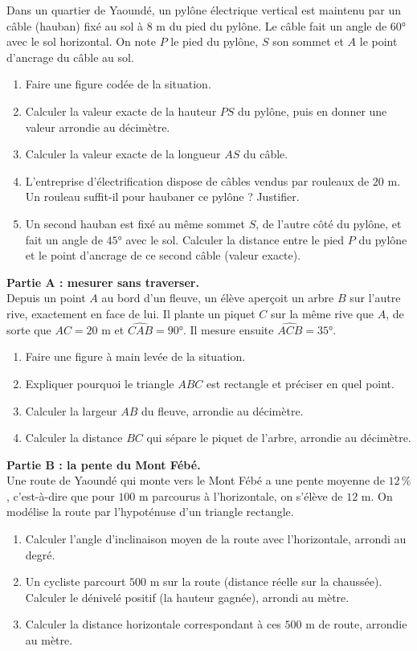 \documentclass[11pt]{article}
\begin{document}
\begin{exercice}
Dans un quartier de Yaoundé, un pylône électrique vertical est maintenu par un câble (hauban) fixé au sol à $8$ m du pied du pylône. Le câble fait un angle de $60°$ avec le sol horizontal. On note $P$ le pied du pylône, $S$ son sommet et $A$ le point d'ancrage du câble au sol.
\begin{enumerate}
\item Faire une figure codée de la situation.
\item Calculer la valeur exacte de la hauteur $PS$ du pylône, puis en donner une valeur arrondie au décimètre.
\item Calculer la valeur exacte de la longueur $AS$ du câble.
\item L'entreprise d'électrification dispose de câbles vendus par rouleaux de $20$ m. Un rouleau suffit-il pour haubaner ce pylône ? Justifier.
\item Un second hauban est fixé au même sommet $S$, de l'autre côté du pylône, et fait un angle de $45°$ avec le sol. Calculer la distance entre le pied $P$ du pylône et le point d'ancrage de ce second câble (valeur exacte).
\end{enumerate}
\end{exercice}

\begin{exercice}
\textbf{Partie A : mesurer sans traverser.}\\
Depuis un point $A$ au bord d'un fleuve, un élève aperçoit un arbre $B$ sur l'autre rive, exactement en face de lui. Il plante un piquet $C$ sur la même rive que $A$, de sorte que $AC = 20$ m et $\widehat{CAB} = 90°$. Il mesure ensuite $\widehat{ACB} = 35°$.
\begin{enumerate}
\item Faire une figure à main levée de la situation.
\item Expliquer pourquoi le triangle $ABC$ est rectangle et préciser en quel point.
\item Calculer la largeur $AB$ du fleuve, arrondie au décimètre.
\item Calculer la distance $BC$ qui sépare le piquet de l'arbre, arrondie au décimètre.
\end{enumerate}
\textbf{Partie B : la pente du Mont Fébé.}\\
Une route de Yaoundé qui monte vers le Mont Fébé a une pente moyenne de $12\,\%$, c'est-à-dire que pour $100$ m parcourus à l'horizontale, on s'élève de $12$ m. On modélise la route par l'hypoténuse d'un triangle rectangle.
\begin{enumerate}
\item[5.] Calculer l'angle d'inclinaison moyen de la route avec l'horizontale, arrondi au degré.
\item[6.] Un cycliste parcourt $500$ m sur la route (distance réelle sur la chaussée). Calculer le dénivelé positif (la hauteur gagnée), arrondi au mètre.
\item[7.] Calculer la distance horizontale correspondant à ces $500$ m de route, arrondie au mètre.
\end{enumerate}
\end{exercice}
\end{document}
